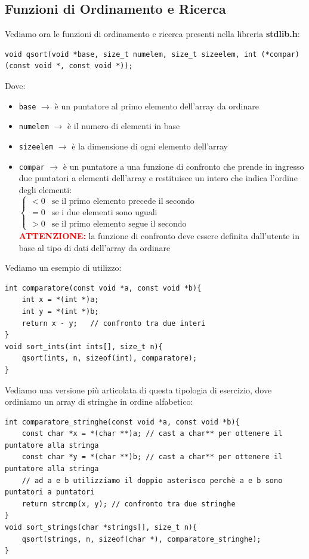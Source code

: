 \subsection{Funzioni di Ordinamento e Ricerca}
Vediamo ora le funzioni di ordinamento e ricerca presenti nella libreria \textbf{stdlib.h}:
\begin{verbatim}
void qsort(void *base, size_t numelem, size_t sizeelem, int (*compar)(const void *, const void *));
\end{verbatim}
Dove:
\begin{itemize}
    \item \texttt{base} $\rightarrow$ è un puntatore al primo elemento dell'array da ordinare
    \item \texttt{numelem} $\rightarrow$ è il numero di elementi in base
    \item \texttt{sizeelem} $\rightarrow$ è la dimensione di ogni elemento dell'array
    \item \texttt{compar} $\rightarrow$ è un puntatore a una funzione di confronto che prende in ingresso due puntatori a 
    elementi dell'array e restituisce un intero che indica l'ordine degli elementi:\medskip\\
    $
    \begin{cases}
    \textbf{$< 0$} & \text{se il primo elemento precede il secondo} \\
    \textbf{$= 0$} & \text{se i due elementi sono uguali} \\
    \textbf{$> 0$} & \text{se il primo elemento segue il secondo}
    \end{cases}
    $\medskip\\
    \textbf{\textcolor{red}{ATTENZIONE:}} la funzione di confronto deve essere definita dall'utente in base al tipo di dati dell'array da ordinare
\end{itemize}
Vediamo un esempio di utilizzo:
\begin{verbatim}
int comparatore(const void *a, const void *b){
    int x = *(int *)a;
    int y = *(int *)b;
    return x - y;   // confronto tra due interi
}
void sort_ints(int ints[], size_t n){
    qsort(ints, n, sizeof(int), comparatore);
}
\end{verbatim}
Vediamo una versione più articolata di questa tipologia di esercizio, dove ordiniamo un array di stringhe in ordine alfabetico:
\begin{verbatim}
int comparatore_stringhe(const void *a, const void *b){
    const char *x = *(char **)a; // cast a char** per ottenere il puntatore alla stringa
    const char *y = *(char **)b; // cast a char** per ottenere il puntatore alla stringa
    // ad a e b utilizziamo il doppio asterisco perchè a e b sono puntatori a puntatori
    return strcmp(x, y); // confronto tra due stringhe
}
void sort_strings(char *strings[], size_t n){
    qsort(strings, n, sizeof(char *), comparatore_stringhe);
}
\end{verbatim}
